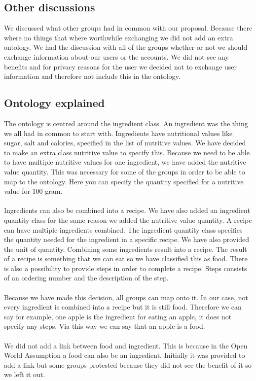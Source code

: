\subsection{Other discussions}
We discussed what other groups had in common with our proposal. Because there where no things that where worthwhile exchanging we did not add an extra ontology.
\newline
\newline
\noindent
We had the discussion with all of the groups whether or not we should exchange information about our users or the accounts. We did not see any benefits and for privacy reasons for the user we decided not to exchange user information and therefore not include this in the ontology.  
\subsection{Ontology explained}
The ontology is centred around the ingredient class. An ingredient was the thing we all had in common to start with. Ingredients have nutritional values like sugar, salt and calories, specified in the list of nutritive values. We have decided to make an extra class nutritive value to specify this. Because we need to be able to have multiple nutritive values for one ingredient, we have added the nutritive value quantity. This was necessary for some of the groups in order to be able to map to the ontology. Here you can specify the quantity specified for a nutritive value for 100 gram.
\\ \\
Ingredients can also be combined into a recipe. We have also added an ingredient quantity class for the same reason we added the nutritive value quantity. A recipe can have multiple ingredients combined. The ingredient quantity class specifies the quantity needed for the ingredient in a specific recipe. We have also provided the unit of quantity. Combining some ingredients result into a recipe. The result of a recipe is something that we can eat so we have classified this as food. There is also a possibility to provide steps in order to complete a recipe. Steps consists of an ordering number and the description of the step. 
\\ \\
Because we have made this decision, all groups can map onto it. In our case, not every ingredient is combined into a recipe but it is still food. Therefore we can say for example, one apple is the ingredient for eating an apple, it does not specify any steps. Via this way we can say that an apple is a food.
\\ \\
We did not add a link between food and ingredient. This is because in the Open World Assumption a food can also be an ingredient. Initially it was provided to add a link but some groups protested because they did not see the benefit of it so we left it out. 

